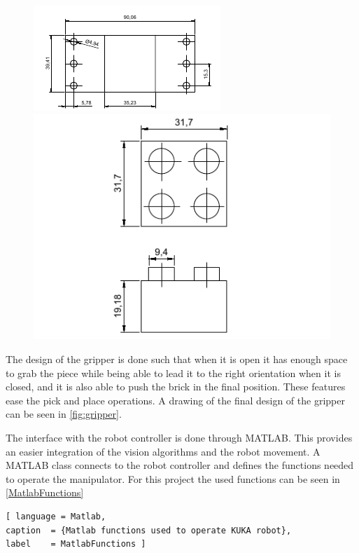 \begin{figure}[H]
    \captionbox
    {
        \label{fig:holder}                                 
    }                                                                 
    {                                                                  
        \includegraphics[width=.4\textwidth]{figures/holder}         
    }                                                                   
    \hspace{5pt}
    \captionbox
    {
        \label{fig:legobrick}                                     
    }                                                                           
    {                                                                            
        \includegraphics[width=.4\textwidth]{figures/LegoPiece}            
    }                                                                            
\end{figure}

The design of the gripper is done such that when it is open it has enough space to grab the piece while being able to lead it to the right orientation when it is closed, and it is also able to push the brick in the final position. These features ease the pick and place operations. A drawing of the final design of the gripper can be seen in \autoref{fig:gripper}.


The interface with the robot controller is done through MATLAB. This provides an easier integration of the vision algorithms and the robot movement. A MATLAB class connects to the robot controller and defines the functions needed to operate the manipulator. For this project the used functions can be seen in \autoref{MatlabFunctions}
\begin{lstlisting}[ language = Matlab,
caption  = {Matlab functions used to operate KUKA robot},
label    = MatlabFunctions ]

\end{lstlisting}

